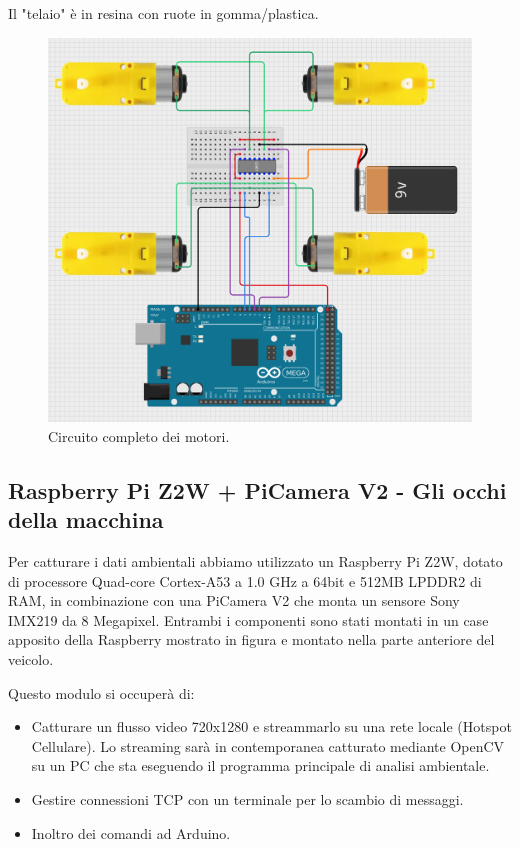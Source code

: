 \documentclass{article}
\begin{document}
Il "telaio" è in resina con ruote in gomma/plastica.



\begin{figure}[h!]
\centering
\includegraphics[width=0.65\linewidth]{Schema_Motori_Arduino.png}
\caption{Circuito completo dei motori.}
\end{figure}


\subsection{Raspberry Pi Z2W + PiCamera V2 - Gli occhi della macchina}

 Per catturare i dati ambientali abbiamo utilizzato un Raspberry Pi Z2W, dotato di processore Quad-core Cortex-A53 a 1.0 GHz a 64bit e 512MB LPDDR2 di RAM, in combinazione con una \cite{picamera} PiCamera V2 che monta un sensore Sony IMX219 da 8 Megapixel. Entrambi i componenti sono stati montati in un case apposito della Raspberry mostrato in figura e montato nella parte anteriore del veicolo.

Questo modulo si occuperà di:
\begin{itemize}
\item Catturare un flusso video 720x1280 e streammarlo su una rete locale (Hotspot Cellulare). Lo streaming sarà in contemporanea catturato mediante OpenCV su un PC che sta eseguendo il programma principale di analisi ambientale.
\item Gestire connessioni TCP con un terminale per lo scambio di messaggi.
\item Inoltro dei comandi ad Arduino.
\end{itemize}
\end{document}
